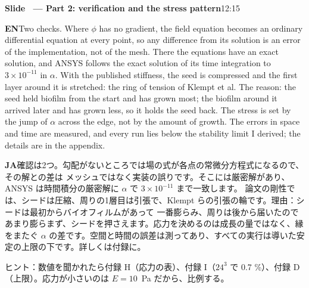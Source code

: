 \documentclass[11pt,a4paper]{article}
\newcounter{sl}
\newcommand{\slide}[2]{\stepcounter{sl}\vspace{8pt}%
  {\color{c3}\large\bfseries Slide \thesl\ --- #1}\hfill{\small #2}\par\vspace{2pt}}
\newcommand{\EN}{\textbf{EN}\quad}
\newcommand{\JA}{\par\textbf{JA}\quad}
\newcommand{\hint}[1]{\par{\color{gray}\small ヒント：#1}}
\begin{document}
\slide{Part 2: verification and the stress pattern}{12:15}
\EN Two checks. Where $\phi$ has no gradient, the field equation becomes an ordinary differential equation at
every point, so any difference from its solution is an error of the implementation, not of the mesh. There the
equations have an exact solution, and ANSYS follows the exact
solution of its time integration to $3\times10^{-11}$ in $\alpha$. With the published stiffness, the seed is compressed
and the first layer around it is stretched: the ring of tension of Klempt et al. The reason: the seed held biofilm
from the start and has grown most; the biofilm around it arrived later and has grown less, so it holds the seed back.
The stress is set by the jump of $\alpha$ across the edge, not by the amount of growth. The errors in space and time
are measured, and every run lies below the stability limit I derived; the details are in the appendix.
\JA 確認は2つ。勾配がないところでは場の式が各点の常微分方程式になるので、その解との差は
メッシュではなく実装の誤りです。そこには厳密解があり、ANSYS は時間積分の厳密解に $\alpha$ で $3\times10^{-11}$ まで一致します。
論文の剛性では、シードは圧縮、周りの1層目は引張で、Klempt らの引張の輪です。理由：シードは最初からバイオフィルムがあって
一番膨らみ、周りは後から届いたのであまり膨らまず、シードを押さえます。応力を決めるのは成長の量ではなく、縁をまたぐ
$\alpha$ の差です。空間と時間の誤差は測ってあり、すべての実行は導いた安定の上限の下です。詳しくは付録に。
\hint{数値を聞かれたら付録 H（応力の表）、付録 I（$24^3$ で 0.7 \%）、付録 D（上限）。応力が小さいのは $E=10$~Pa だから、比例する。}
\end{document}
